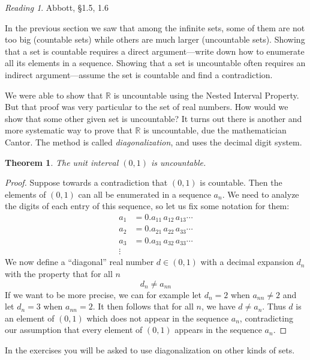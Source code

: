 \documentclass[11pt,oneside]{amsbook}
\newcommand{\R}{\mathbb R}
\theoremstyle{definition}
\theoremstyle{plain}
\newtheorem{theorem}{Theorem}[section]
\theoremstyle{definition}
\theoremstyle{remark}
\newtheorem*{reading}{Reading}
\numberwithin{equation}{section}
\numberwithin{figure}{section}
\begin{document}
\begin{reading}
  Abbott, \S 1.5, 1.6
\end{reading}

In the previous section we saw that among the infinite sets, some of them are not too big (countable sets) while others are much larger (uncountable sets). Showing that a set is countable requires a direct argument---write down how to enumerate all its elements in a sequence. Showing that a set is uncountable often requires an indirect argument---assume the set is countable and find a contradiction.

We were able to show that $\R$ is uncountable using the Nested Interval Property. But that proof was very particular to the set of real numbers. How would we show that some other given set is uncountable? It turns out there is another and more systematic way to prove that $\R$ is uncountable, due the mathematician Cantor. The method is called \emph{diagonalization}, and uses the decimal digit system.

\begin{theorem}
  The unit interval $(0,1)$ is uncountable.
\end{theorem}

\begin{proof}
  Suppose towards a contradiction that $(0,1)$ is countable. Then the elements of $(0,1)$ can all be enumerated in a sequence $a_n$. We need to analyze the digits of each entry of this sequence, so let us fix some notation for them:
  \begin{align*}
    a_1&=0.a_{11}\,a_{12}\,a_{13}\cdots\\
    a_2&=0.a_{21}\,a_{22}\,a_{33}\cdots\\
    a_3&=0.a_{31}\,a_{32}\,a_{33}\cdots\\
    \vdots&
  \end{align*}
  We now define a ``diagonal'' real number $d\in(0,1)$ with a decimal expansion $d_n$ with the property that for all $n$
  \[d_n\neq a_{nn}
  \]
  If we want to be more precise, we can for example let $d_n=2$ when $a_{nn}\neq2$ and let $d_n=3$ when $a_{nn}=2$. It then follows that for all $n$, we have $d\neq a_n$. Thus $d$ is an element of $(0,1)$ which does not appear in the sequence $a_n$, contradicting our assumption that every element of $(0,1)$ appears in the sequence $a_n$.
\end{proof}

In the exercises you will be asked to use diagonalization on other kinds of sets.
\end{document}
